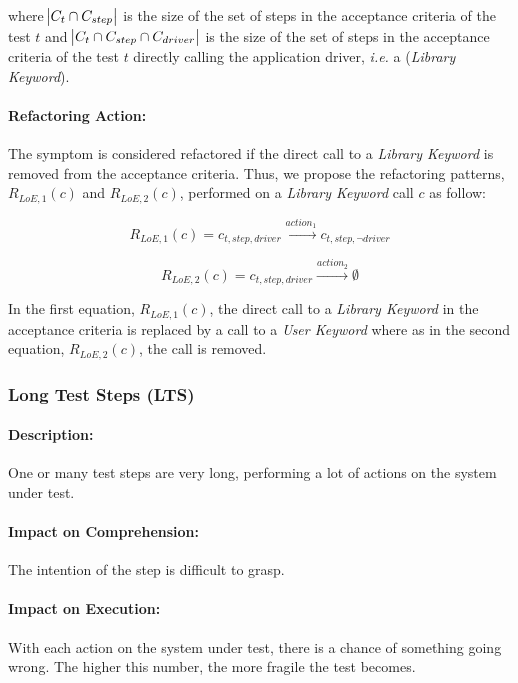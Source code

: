 where $\abs{C_{t} \cap C_{step}}$ is the size of the set of steps in the acceptance criteria of the test $t$ and $\abs{C_{t} \cap C_{step} \cap C_{driver}}$ is the size of the set of steps in the acceptance criteria of the test $t$ directly calling the application driver, \emph{i.e.} a (\emph{Library Keyword}).

\paragraph{Refactoring Action:}

The symptom is considered refactored if the direct call to a \emph{Library Keyword} is removed from the acceptance criteria. Thus, we propose the refactoring patterns, $R_{LoE, 1}(c)$ and $R_{LoE, 2}(c)$, performed on a \emph{Library Keyword} call $c$ as follow:

\begin{equation*}
    R_{LoE, 1}(c) = c_{t, step, driver} \xrightarrow{action_1} c_{t, step, \neg driver}
\end{equation*}

\begin{equation*}
    R_{LoE, 2}(c) = c_{t, step, driver} \xrightarrow{action_2} \emptyset
\end{equation*}

In the first equation, $R_{LoE, 1}(c)$, the direct call to a \emph{Library Keyword} in the acceptance criteria is replaced by a call to a \emph{User Keyword} where as in the second equation, $R_{LoE, 2}(c)$, the call is removed.

\subsubsection{Long Test Steps (LTS)}

\paragraph{Description:}

One or many test steps are very long, performing a lot of actions on the system under test.

\paragraph{Impact on Comprehension:} The intention of the step is difficult to grasp.

\paragraph{Impact on Execution:} With each action on the system under test, there is a chance of something going wrong. The higher this number, the more fragile the test becomes.

